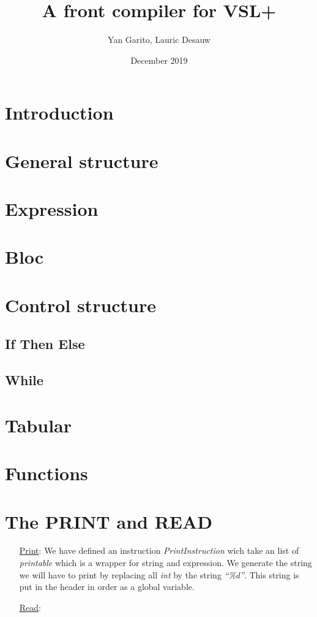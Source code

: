 \documentclass{article}
\title{A front compiler for VSL+}
\author{Yan Garito, Lauric Desauw}
\date{December 2019}
\begin{document}
\maketitle

\section{Introduction}
\section{General structure}
\section{Expression}

\section{Bloc}

\section{Control structure}
\subsection{If Then Else}
\subsection{While}

\section{Tabular}

\section{Functions}

\section{The PRINT and READ}

\begin{itemize}
\item[\underline{Print}:] We have defined an instruction \emph{PrintInstruction}
  wich take an list of \emph{printable} which is a wrapper for string and
  expression.
  We generate the string we will have to print by replacing all \emph{int} by the
  string \emph{``\%d''}. This string is put in the header in order as a global
  variable. 
\item[\underline{Read}:]
\end{itemize}
\end{document}
